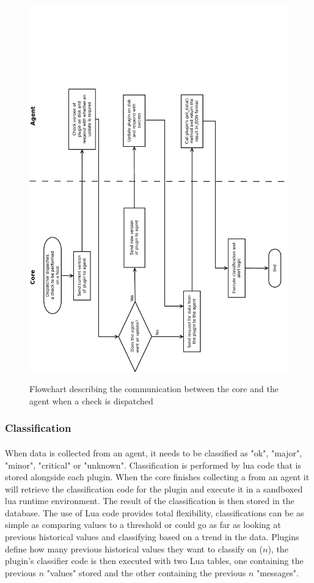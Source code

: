 \documentclass[bsc,logo,twoside]{infthesis}
\begin{document}
\begin{figure}[H]
	\caption{Flowchart describing the communication between the core and the agent
		when a check is dispatched}
	\includegraphics[scale=0.6, angle=-90]{assets/core_agent_communication.pdf}
	\label{core_agent_communication}
\end{figure}
	
\subsubsection{Classification}
\paragraph*{}
	When data is collected from an agent, it needs to be classified as "ok", "major",
	"minor", "critical" or "unknown".  Classification is performed by lua code that
	is stored alongside each plugin.  When the core finishes collecting a 
	from an agent it will retrieve the classification code for the plugin and execute
	it in a sandboxed lua runtime environment.  The result of the classification is
	then stored in the database.  The use of Lua code provides total flexibility,
	classifications can be as simple as comparing values to a threshold or could go
	as far as looking at previous historical values and classifying based on a trend
	in the data. Plugins define how many previous historical values they want to
	classify on ($n$), the plugin's classifier code is then executed with two Lua
	tables, one containing the previous $n$ "values" stored and the other containing
	the previous $n$ "messages".
	
\end{document}
